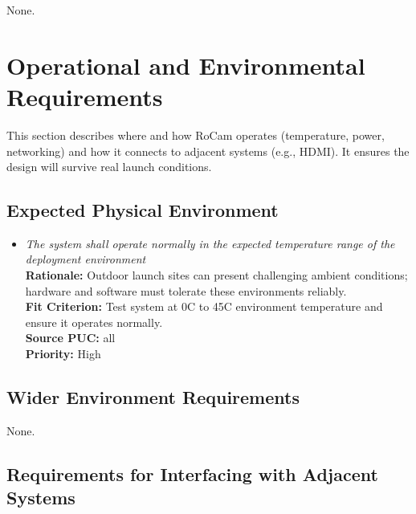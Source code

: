 \documentclass[12pt]{article}
\begin{document}
None.

\section{Operational and Environmental Requirements}

This section describes where and how RoCam operates (temperature, power,
networking) and how it connects to adjacent systems (e.g., HDMI). It ensures
the design will survive real launch conditions.

\subsection{Expected Physical Environment}
\begin{itemize}[leftmargin=*]
  \item[EPE-1] \emph{The system shall operate normally in the expected temperature
          range of the deployment environment}\\[2mm]
        \textbf{Rationale:} Outdoor launch sites can present challenging ambient conditions; hardware and software must tolerate these environments reliably.\\
        \textbf{Fit Criterion:} Test system at 0C to 45C environment temperature and ensure it operates normally.\\
        \textbf{Source PUC:} all \\
        \textbf{Priority:} High
\end{itemize}

\subsection{Wider Environment Requirements}

None.

\subsection{Requirements for Interfacing with Adjacent Systems}
\end{document}
